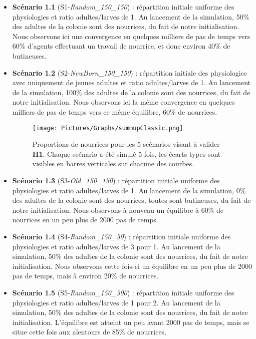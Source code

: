 	\begin{itemize}	
		\item \textbf{Scénario 1.1} (S1-\textit{Random\_150\_150}) : répartition initiale uniforme des physiologies et ratio adultes/larves de 1. Au lancement de la simulation, 50\% des adultes de la colonie sont des nourrices, du fait de notre initialisation. Nous observons ici une convergence en quelques milliers de pas de temps vers 60\% d'agents effectuant un travail de nourrice, et donc environ 40\% de butineuses.
		
		\item \textbf{Scénario 1.2} (S2-\textit{NewBorn\_150\_150}) : répartition initiale des physiologies avec uniquement de jeunes adultes et ratio adultes/larves de 1. Au lancement de la simulation, 100\% des adultes de la colonie sont des nourrices, du fait de notre initialisation. Nous observons ici la même convergence en quelques milliers de pas de temps vers ce même équilibre, 60\% de nourrices.
	
	\begin{figure}
	\centering
	\texttt{[image: Pictures/Graphs/summupClassic.png]}
	\caption[Proportions de nourrices pour les 5 scénarios visant à valider \textbf{H1}.]{Proportions de nourrices pour les 5 scénarios visant à valider \textbf{H1}. Chaque scénario a été simulé 5 fois, les écarts-types sont visibles en barres verticales sur chacune des courbes.}
	\label{envConstant}
	\end{figure}
		
		\item \textbf{Scénario 1.3} (S3-\textit{Old\_150\_150}) : répartition initiale uniforme des physiologies et ratio adultes/larves de 1. Au lancement de la simulation, 0\% des adultes de la colonie sont des nourrices, toutes sont butineuses, du fait de notre initialisation. Nous observons à nouveau un équilibre à 60\% de nourrices en un peu plus de 2000 pas de temps.
		
		\item \textbf{Scénario 1.4} (S4-\textit{Random\_150\_50}) : répartition initiale uniforme des physiologies et ratio adultes/larves de 3 pour 1. Au lancement de la simulation, 50\% des adultes de la colonie sont des nourrices, du fait de notre initialisation. Nous observons cette fois-ci un équilibre en un peu plus de 2000 pas de temps, mais à environ 20\% de nourrices.
		
		\item \textbf{Scénario 1.5} (S5-\textit{Random\_150\_300}) : répartition initiale uniforme des physiologies et ratio adultes/larves de 1 pour 2. Au lancement de la simulation, 50\% des adultes de la colonie sont des nourrices, du fait de notre initialisation. L'équilibre est atteint un peu avant 2000 pas de temps, mais se situe cette fois aux alentours de 85\% de nourrices.		
	\end{itemize}
	
